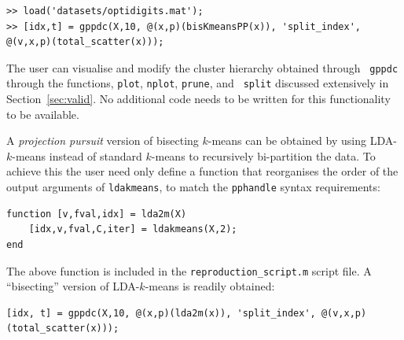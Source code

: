\documentclass{book}
\begin{document}
\begin{verbatim}
>> load('datasets/optidigits.mat');
>> [idx,t] = gppdc(X,10, @(x,p)(bisKmeansPP(x)), 'split_index', @(v,x,p)(total_scatter(x)));
\end{verbatim}

\noindent
%
The user can visualise and modify the cluster hierarchy obtained through {\tt
gppdc} through the functions, {\tt plot}, {\tt nplot}, {\tt prune}, and {\tt
split} discussed extensively in Section~\ref{sec:valid}. No additional code
needs to be written for this functionality to be available.



A {\em projection pursuit} version of bisecting $k$-means
can be obtained by using LDA-$k$-means instead of standard $k$-means to recursively bi-partition
the data.
To achieve this the user need only define a function that reorganises the order of the output
arguments of {\tt ldakmeans}, to match the {\tt pphandle} syntax requirements:

\begin{verbatim}
function [v,fval,idx] = lda2m(X)
	[idx,v,fval,C,iter] = ldakmeans(X,2);
end
\end{verbatim}

\noindent
%
The above function is included in the {\tt reproduction\_script.m} script file.
A ``bisecting'' version of LDA-$k$-means is readily obtained:

\begin{verbatim}
[idx, t] = gppdc(X,10, @(x,p)(lda2m(x)), 'split_index', @(v,x,p)(total_scatter(x)));
\end{verbatim}






\end{document}
